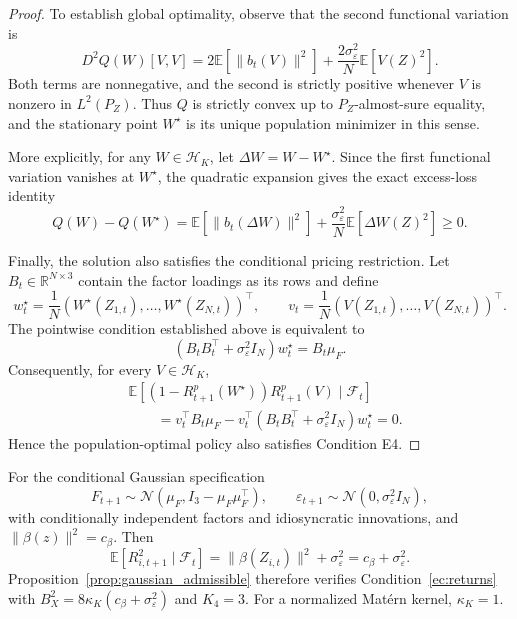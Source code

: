 \begin{proof}
To establish global optimality, observe that the second functional variation is
\[
D^2Q(W)[V,V]
=2\mathbb E[\|b_t(V)\|^2]
+\frac{2\sigma_\varepsilon^2}{N}\mathbb E[V(Z)^2].
\]
Both terms are nonnegative, and the second is strictly positive whenever $V$ is nonzero in $L^2(P_Z)$. Thus $Q$ is strictly convex up to $P_Z$-almost-sure equality, and the stationary point $W^\star$ is its unique population minimizer in this sense.

More explicitly, for any $W\in\mathcal H_K$, let $\Delta W=W-W^\star$. Since the first functional variation vanishes at $W^\star$, the quadratic expansion gives the exact excess-loss identity
\[
Q(W)-Q(W^\star)
=\mathbb E[\|b_t(\Delta W)\|^2]
+\frac{\sigma_\varepsilon^2}{N}\mathbb E[\Delta W(Z)^2]\geq0.
\]

Finally, the solution also satisfies the conditional pricing restriction. Let $B_t\in\mathbb R^{N\times3}$ contain the factor loadings as its rows and define
\[
w_t^\star=\frac1N(W^\star(Z_{1,t}),\ldots,W^\star(Z_{N,t}))^\top,
\qquad
v_t=\frac1N(V(Z_{1,t}),\ldots,V(Z_{N,t}))^\top.
\]
The pointwise condition established above is equivalent to
\[
(B_tB_t^\top+\sigma_\varepsilon^2I_N)w_t^\star=B_t\mu_F.
\]
Consequently, for every $V\in\mathcal H_K$,
\[
\begin{aligned}
&\mathbb E[(1-R^p_{t+1}(W^\star))R^p_{t+1}(V)\mid\mathcal F_t]\\
&\qquad=v_t^\top B_t\mu_F
-v_t^\top(B_tB_t^\top+\sigma_\varepsilon^2I_N)w_t^\star=0.
\end{aligned}
\]
Hence the population-optimal policy also satisfies Condition E4.
\end{proof}




For the conditional Gaussian specification
\[
F_{t+1}\sim\mathcal N(\mu_F,I_3-\mu_F\mu_F^\top),
\qquad
\varepsilon_{t+1}\sim\mathcal N(0,\sigma_\varepsilon^2I_N),
\]
with conditionally independent factors and idiosyncratic innovations,
and $\|\beta(z)\|^2=c_\beta$.
Then
\[
\mathbb E[R_{i,t+1}^2\mid\mathcal F_t]
=\|\beta(Z_{i,t})\|^2+\sigma_\varepsilon^2
=c_\beta+\sigma_\varepsilon^2.
\]
Proposition~\ref{prop:gaussian_admissible} therefore verifies
Condition~\ref{ec:returns} with
$B_X^2=8\kappa_K(c_\beta+\sigma_\varepsilon^2)$ and $K_4=3$.
For a normalized Mat\'ern kernel, $\kappa_K=1$.



